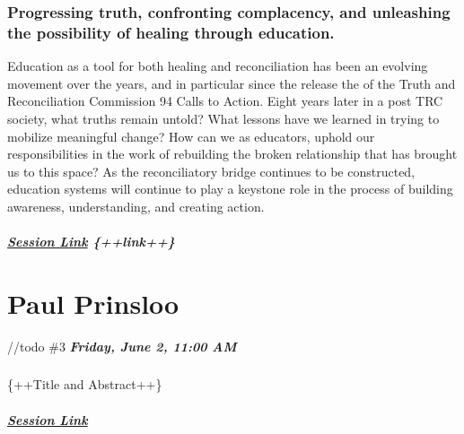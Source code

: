 \documentclass[
]{book}
\begin{document}
\begin{keynote}
\hypertarget{progressing-truth-confronting-complacency-and-unleashing-the-possibility-of-healing-through-education.}{%
\subsubsection*{Progressing truth, confronting complacency, and
unleashing the possibility of healing through
education.}\label{progressing-truth-confronting-complacency-and-unleashing-the-possibility-of-healing-through-education.}}

Education as a tool for both healing and reconciliation has been an
evolving movement over the years, and in particular since the release
the of the Truth and Reconciliation Commission 94 Calls to Action. Eight
years later in a post TRC society, what truths remain untold? What
lessons have we learned in trying to mobilize meaningful change? How can
we as educators, uphold our responsibilities in the work of rebuilding
the broken relationship that has brought us to this space? As the
reconciliatory bridge continues to be constructed, education systems
will continue to play a keystone role in the process of building
awareness, understanding, and creating action.

\hypertarget{session-link-link}{%
\subparagraph{\texorpdfstring{\href{}{Session Link}
\{++link++\}}{Session Link \{++link++\}}}\label{session-link-link}}
\end{keynote}

\hypertarget{paul-prinsloo}{%
\section*{Paul Prinsloo}\label{paul-prinsloo}}

//todo \#3
\textbf{\emph{Friday, June 2, 11:00 AM}}

\begin{keynote}
\hypertarget{section}{%
\subsubsection{}\label{section}}

\{++Title and Abstract++\}

\hypertarget{session-link}{%
\subparagraph{\texorpdfstring{\href{}{Session
Link}}{Session Link}}\label{session-link}}
\end{keynote}
\end{document}
